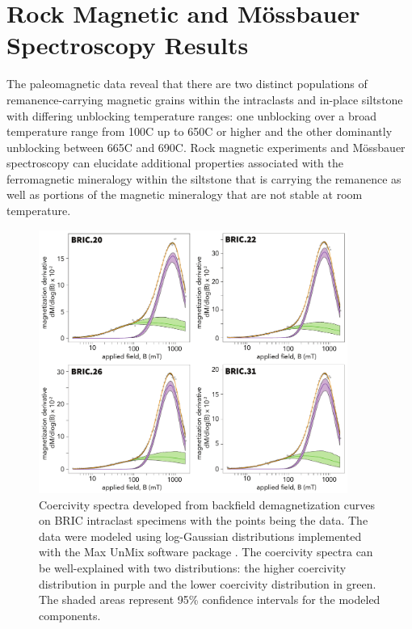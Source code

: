 \documentclass[draft]{agujournal2018}
\begin{document}
\section*{Rock Magnetic and M{\"o}ssbauer Spectroscopy Results}

The paleomagnetic data reveal that there are two distinct populations of remanence-carrying magnetic grains within the intraclasts and in-place siltstone with differing unblocking temperature ranges: one unblocking over a broad temperature range from 100\textdegree C up to 650\textdegree C or higher and the other dominantly unblocking between 665\textdegree C and 690\textdegree C. Rock magnetic experiments and M{\"o}ssbauer spectroscopy can elucidate additional properties associated with the ferromagnetic mineralogy within the siltstone that is carrying the remanence as well as portions of the magnetic mineralogy that are not stable at room temperature.

\begin{figure}[!ht]
\noindent\includegraphics[width=0.9\textwidth]{figures/coercivity_spectra.pdf}
\caption{\small{Coercivity spectra developed from backfield demagnetization curves on BRIC intraclast specimens with the points being the data. The data were modeled using log-Gaussian distributions implemented with the Max UnMix software package \citep{Maxbauer2016a}. The coercivity spectra can be well-explained with two distributions: the higher coercivity distribution in purple and the lower coercivity distribution in green. The shaded areas represent 95\% confidence intervals for the modeled components.}}
\label{fig:coercivity_spectra}
\end{figure}
\end{document}
